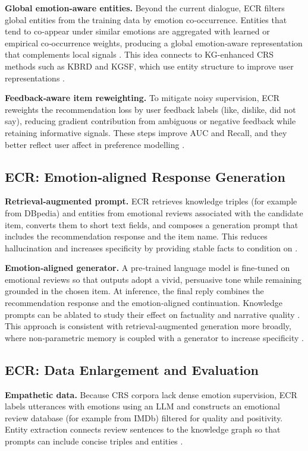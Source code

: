 \documentclass[12pt]{article}
\begin{document}
  \textbf{Global emotion‑aware entities.} Beyond the current dialogue, ECR filters global entities from the training data by emotion co‑occurrence. Entities that tend to co‑appear under similar emotions are aggregated with learned or empirical co‑occurrence weights, producing a global emotion‑aware representation that complements local signals \citep{zhang2024ecr}. This idea connects to KG-enhanced CRS methods such as KBRD and KGSF, which use entity structure to improve user representations \citep{chen2020kbrd,zhou2020kgsf}.
  
  \textbf{Feedback‑aware item reweighting.} To mitigate noisy supervision, ECR reweights the recommendation loss by user feedback labels (like, dislike, did not say), reducing gradient contribution from ambiguous or negative feedback while retaining informative signals. These steps improve AUC and Recall, and they better reflect user affect in preference modelling \citep{zhang2024ecr}.
  
  \subsection{ECR: Emotion‑aligned Response Generation}
  \textbf{Retrieval‑augmented prompt.} ECR retrieves knowledge triples (for example from DBpedia) and entities from emotional reviews associated with the candidate item, converts them to short text fields, and composes a generation prompt that includes the recommendation response and the item name. This reduces hallucination and increases specificity by providing stable facts to condition on \citep{zhang2024ecr,dbpedia_wikipedia,lewis2020rag}.
  
  \textbf{Emotion‑aligned generator.} A pre‑trained language model is fine‑tuned on emotional reviews so that outputs adopt a vivid, persuasive tone while remaining grounded in the chosen item. At inference, the final reply combines the recommendation response and the emotion‑aligned continuation. Knowledge prompts can be ablated to study their effect on factuality and narrative quality \citep{zhang2024ecr}. This approach is consistent with retrieval‑augmented generation more broadly, where non‑parametric memory is coupled with a generator to increase specificity \citep{lewis2020rag}.
  
  \subsection{ECR: Data Enlargement and Evaluation}
  \textbf{Empathetic data.} Because CRS corpora lack dense emotion supervision, ECR labels utterances with emotions using an LLM and constructs an emotional review database (for example from IMDb) filtered for quality and positivity. Entity extraction connects review sentences to the knowledge graph so that prompts can include concise triples and entities \citep{zhang2024ecr}.
  
\end{document}
